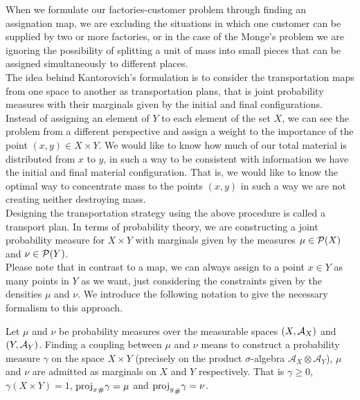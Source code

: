 When we formulate our factories-customer problem through finding an assignation map, we are excluding the situations in which one customer can be supplied by two or more factories, or in the case of the Monge's problem we are ignoring the possibility of splitting a unit of mass into small pieces that can be assigned simultaneously to different places. \\

The idea behind Kantorovich's formulation is to consider the transportation maps from one space to another as transportation plans, that is joint probability measures with their marginals given by the initial and final configurations.\\

Instead of assigning an element of $Y$ to each element of the set $X$, we can see the problem from a different perspective and assign a weight to the importance of the point $\left(x, y\right)\in X\times Y$. We would like to know how much of our total material is distributed from $x$ to $y$, in such a way to be consistent with information we have the initial and final material configuration. That is, we would like to know the optimal way to concentrate mass to the points $(x, y)$ in such a way we are not creating neither destroying mass. \\

Designing the transportation strategy using the above procedure is called a transport plan. In terms of probability theory, we are constructing a joint probability measure for $X\times Y$ with marginals given by the measures $\mu \in \mathcal{P}(X)$ and $\nu \in \mathcal{P}(Y)$. \\

Please note that in contrast to a map, we can always assign to a point $x\in Y$ as many points in $Y$ as we want, just considering the constraints given by the densities $\mu$ and $\nu$. We introduce the following notation to give the necessary formalism to this approach. 

\begin{definition}[Coupling]
Let $\mu$ and $\nu$ be probability measures over the measurable spaces $\left( X, \mathcal{A}_X \right)$ and $\left( Y, \mathcal{A}_Y \right)$. Finding a coupling between $\mu$ and $\nu$ means to construct a probability measure $\gamma$ on the space $X\times Y$ (precisely on the product $\sigma$-algebra $\mathcal{A}_X\otimes\mathcal{A}_Y$), $\mu$ and $\nu$ are admitted as marginals on $X$ and $Y$ respectively. That is $\gamma\geq 0$, $\gamma(X\times Y)=1$, ${\mathrm{proj}_x}_{\#} \gamma=\mu$ and ${\mathrm{proj}_y}_{\#} \gamma=\nu$. \label{def: Coupling}
\end{definition}
 

